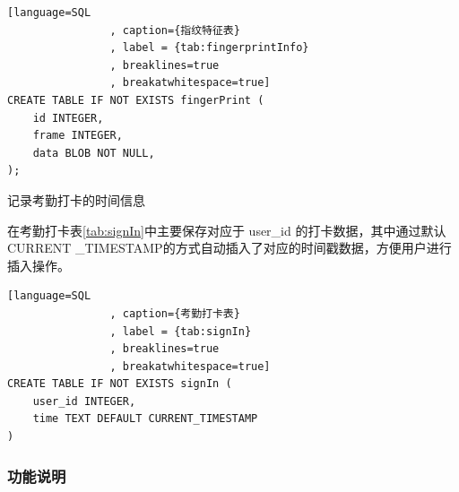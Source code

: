 \begin{description}
            \begin{lstlisting}[language=SQL
                , caption={指纹特征表}
                , label = {tab:fingerprintInfo}
                , breaklines=true
                , breakatwhitespace=true]
CREATE TABLE IF NOT EXISTS fingerPrint (
    id INTEGER,
    frame INTEGER,
    data BLOB NOT NULL,
);
            \end{lstlisting}          


        \item[考勤打卡表] 记录考勤打卡的时间信息
        
            在考勤打卡表\ref{tab:signIn}中主要保存对应于 user\_id 的打卡数据，其中通过默认CURRENT
            \_TIMESTAMP的方式自动插入了对应的时间戳数据，方便用户进行插入操作。

            \begin{lstlisting}[language=SQL
                , caption={考勤打卡表}
                , label = {tab:signIn}
                , breaklines=true
                , breakatwhitespace=true]
CREATE TABLE IF NOT EXISTS signIn (
    user_id INTEGER,
    time TEXT DEFAULT CURRENT_TIMESTAMP
)
            \end{lstlisting}    

    \end{description}

    \subsubsection{功能说明}

